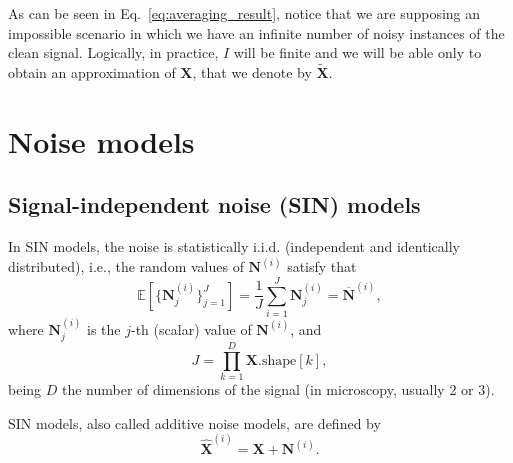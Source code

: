 \documentclass{article}
\begin{document}
As can be seen in Eq.~\ref{eq:averaging_result}, notice that we are
supposing an impossible scenario in which we have an infinite number
of noisy instances of the clean signal. Logically, in practice, $I$
will be finite and we will be able only to obtain an approximation of
${\mathbf X}$, that we denote by $\tilde{\mathbf X}$.

\section{Noise models}
\label{sec:noise_models}

\subsection{Signal-independent noise (SIN) models}
In SIN models, the noise is statistically i.i.d. (independent and
identically distributed), i.e., the random values of ${\mathbf N}^{(i)}$ satisfy that
\begin{equation}
  {\mathbb E}[\{{\mathbf N}^{(i)}_j\}_{j=1}^J]=\frac{1}{J} \sum_{i=1}^J {\mathbf N}_j^{(i)}=\overline{\mathbf N}^{(i)},
  \label{eq:noise_expectation_1}
\end{equation}
where ${\mathbf N}^{(i)}_j$ is the $j$-th (scalar) value
of ${\mathbf N}^{(i)}$, and
\begin{equation}
  J=\prod_{k=1}^D \mathbf{X}.\text{shape}[k],
\end{equation}
being $D$ the number of dimensions of the signal (in microscopy, usually 2 or 3).

SIN models, also called additive noise models, are defined by
\begin{equation}
  \hat{\mathbf X}^{(i)} = {\mathbf X} + {\mathbf N}^{(i)}.
  \label{eq:additive_noisy_model}
\end{equation}
\end{document}
